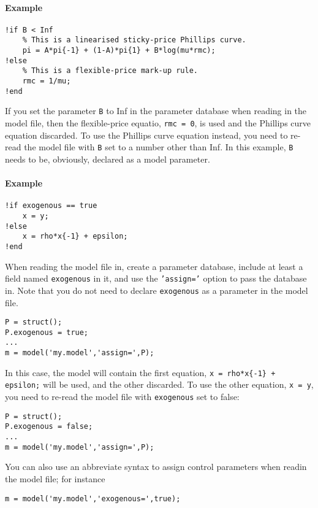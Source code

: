 \paragraph{Example}\label{example}

\begin{verbatim}
!if B < Inf
    % This is a linearised sticky-price Phillips curve.
    pi = A*pi{-1} + (1-A)*pi{1} + B*log(mu*rmc);
!else
    % This is a flexible-price mark-up rule.
    rmc = 1/mu;
!end
\end{verbatim}

If you set the parameter \texttt{B} to Inf in the parameter database
when reading in the model file, then the flexible-price equatio,
\texttt{rmc = 0}, is used and the Phillips curve equation discarded. To
use the Phillips curve equation instead, you need to re-read the model
file with \texttt{B} set to a number other than Inf. In this example,
\texttt{B} needs to be, obviously, declared as a model parameter.

\paragraph{Example}\label{example-1}

\begin{verbatim}
!if exogenous == true
    x = y;
!else
    x = rho*x{-1} + epsilon;
!end
\end{verbatim}

When reading the model file in, create a parameter database, include at
least a field named \texttt{exogenous} in it, and use the
\texttt{'assign='} option to pass the database in. Note that you do not
need to declare \texttt{exogenous} as a parameter in the model file.

\begin{verbatim}
P = struct();
P.exogenous = true;
...
m = model('my.model','assign=',P);
\end{verbatim}

In this case, the model will contain the first equation,
\texttt{x = rho*x\{-1\} + epsilon;} will be used, and the other
discarded. To use the other equation, \texttt{x = y}, you need to
re-read the model file with \texttt{exogenous} set to false:

\begin{verbatim}
P = struct();
P.exogenous = false;
...
m = model('my.model','assign=',P);
\end{verbatim}

You can also use an abbreviate syntax to assign control parameters when
readin the model file; for instance

\begin{verbatim}
m = model('my.model','exogenous=',true);
\end{verbatim}


